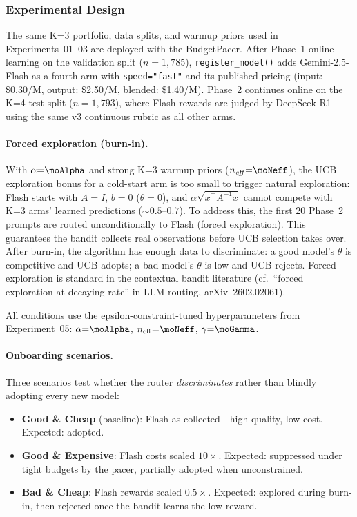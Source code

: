 \subsubsection{Experimental Design}

The same K=3 portfolio, data splits, and warmup priors used in
Experiments~01--03 are deployed with the BudgetPacer.
After Phase~1 online learning on the validation split ($n{=}1{,}785$),
\texttt{register\_model()} adds Gemini-2.5-Flash as a fourth arm
with \texttt{speed="fast"} and its published pricing
(input: \$0.30/M, output: \$2.50/M, blended: \$1.40/M).
Phase~2 continues online on the K=4 test split ($n{=}1{,}793$),
where Flash rewards are judged by DeepSeek-R1 using the same v3
continuous rubric as all other arms.

\paragraph{Forced exploration (burn-in).}
With $\alpha{=}\moAlpha$ and strong K=3 warmup priors
($n_\mathit{eff}{=}\moNeff$), the UCB exploration bonus for a
cold-start arm is too small to trigger natural exploration: Flash
starts with $A{=}I$, $b{=}0$ ($\theta{=}0$), and
$\alpha\sqrt{x^\top A^{-1} x}$ cannot compete with K=3 arms' learned
predictions (${\sim}0.5$--$0.7$).
To address this, the first 20 Phase~2 prompts are routed
unconditionally to Flash (forced exploration).
This guarantees the bandit collects real observations before UCB
selection takes over.
After burn-in, the algorithm has enough data to discriminate: a
good model's $\theta$ is competitive and UCB adopts; a bad model's
$\theta$ is low and UCB rejects.
Forced exploration is standard in the contextual bandit literature
(cf.\ ``forced exploration at decaying rate'' in LLM routing,
arXiv~2602.02061).

All conditions use the epsilon-constraint-tuned hyperparameters from
Experiment~05: $\alpha{=}\moAlpha$,
$n_{\mathrm{eff}}{=}\moNeff$, $\gamma{=}\moGamma$.

\paragraph{Onboarding scenarios.}
Three scenarios test whether the router \emph{discriminates} rather
than blindly adopting every new model:
\begin{itemize}[nosep,leftmargin=*]
  \item \textbf{Good \& Cheap} (baseline): Flash as collected---high
    quality, low cost.  Expected: adopted.
  \item \textbf{Good \& Expensive}: Flash costs scaled $10\times$.
    Expected: suppressed under tight budgets by the pacer, partially
    adopted when unconstrained.
  \item \textbf{Bad \& Cheap}: Flash rewards scaled $0.5\times$.
    Expected: explored during burn-in, then rejected once the bandit
    learns the low reward.
\end{itemize}

